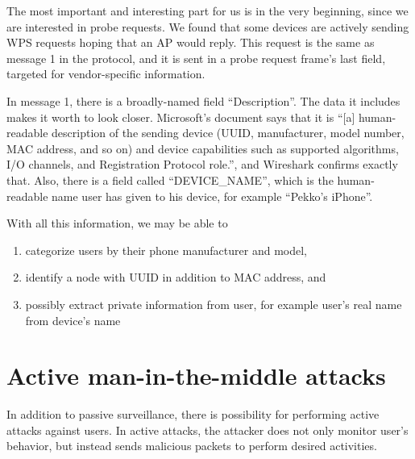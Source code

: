 \documentclass[12pt,a4paper,oneside,pdftex]{report}
\begin{document}
The most important and interesting part for us is in the very beginning, since we are interested in probe requests. We found that some devices are actively sending WPS requests hoping that an AP would reply. This request is the same as message 1 in the protocol, and it is sent in a probe request frame's last field, targeted for vendor-specific information.

In message 1, there is a broadly-named field ``Description''. The data it includes makes it worth to look closer. Microsoft's document says that it is ``[a] human-readable description of the sending device (UUID, manufacturer, model number, MAC address, and so on) and device capabilities such as supported algorithms, I/O channels, and Registration Protocol role.'', and Wireshark confirms exactly that. Also, there is a field called ``DEVICE\_NAME'', which is the human-readable name user has given to his device, for example ``Pekko's iPhone''.

With all this information, we may be able to
\begin{enumerate}
    \item categorize users by their phone manufacturer and model,
    \item identify a node with UUID in addition to MAC address, and
    \item possibly extract private information from user, for example user's real name from device's name
\end{enumerate}






\chapter{Active man-in-the-middle attacks}
\label{chapter:attacks}

In addition to passive surveillance, there is possibility for performing active attacks against users. In active attacks, the attacker does not only monitor user's behavior, but instead sends malicious packets to perform desired activities. 
\end{document}
